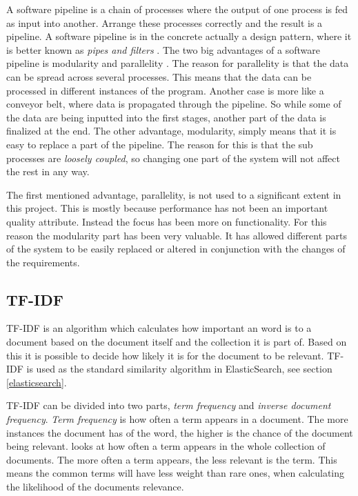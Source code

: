 A software pipeline is a chain of processes where the output of one process is fed as input into another. Arrange these processes correctly and the result is a pipeline. A software pipeline is in the concrete actually a design pattern, where it is better known as \textit{pipes and filters} \cite{pipes-and-filters}. The two big advantages of a software pipeline is modularity and parallelity \cite{dart}. The reason for parallelity is that the data can be spread across several processes. This means that the data can be processed in different instances of the program. Another case is more like a conveyor belt, where data is propagated through the pipeline. So while some of the data are being inputted into the first stages, another part of the data is finalized at the end. The other advantage, modularity, simply means that it is easy to replace a part of the pipeline. The reason for this is that the sub processes are \textit{loosely coupled}, so changing one part of the system will not affect the rest in any way.

The first mentioned advantage, parallelity, is not used to a significant extent in this project. This is mostly because performance has not been an important quality attribute. Instead the focus has been more on functionality. For this reason the modularity part has been very valuable. It has allowed different parts of the system to be easily replaced or altered in conjunction with the changes of the requirements.


\subsection{TF-IDF} \label{tf/idf}
TF-IDF is an algorithm which calculates how important an word is to a document based on the document itself and the collection it is part of. Based on this it is possible to decide how likely it is for the document to be relevant. TF-IDF is used as the standard similarity algorithm in ElasticSearch, see section \ref{elasticsearch}.

TF-IDF can be divided into two parts, \textit{term frequency} and \textit{inverse document frequency}. \textit{Term frequency} is how often a term appears in a document. The more instances the document has of the word, the higher is the chance of the document being relevant.  looks at how often a term appears in the whole collection of documents. The more often a term appears, the less relevant is the term. This means the common terms will have less weight than rare ones, when calculating the likelihood of the documents relevance. 

\cleardoublepage